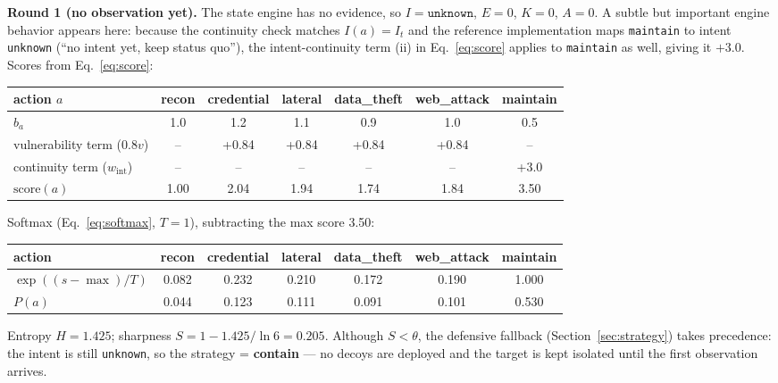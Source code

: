 \documentclass[preprints,article,accept,oneauthor]{Definitions/mdpi}
\newcommand{\act}[1]{\texttt{#1}}
\begin{document}
\textbf{Round 1 (no observation yet).} The state engine has no evidence, so
$I=\act{unknown}$, $E=0$, $K=0$, $A=0$. A subtle but important engine
behavior appears here: because the continuity check matches
$I(a) = I_t$ and the reference implementation maps \act{maintain} to
intent \act{unknown} (``no intent yet, keep status quo''), the
intent-continuity term (ii) in Eq.~\ref{eq:score} applies to
\act{maintain} as well, giving it $+3.0$. Scores from Eq.~\ref{eq:score}:
\begin{center}
\begin{adjustbox}{max width=\linewidth}\begin{tabular}{lcccccc}
\toprule
action $a$ & recon & credential & lateral & data\_theft & web\_attack & maintain \\
\midrule
$b_a$ & 1.0 & 1.2 & 1.1 & 0.9 & 1.0 & 0.5 \\
vulnerability term ($0.8v$) & -- & +0.84 & +0.84 & +0.84 & +0.84 & -- \\
continuity term ($w_{\mathrm{int}}$) & -- & -- & -- & -- & -- & +3.0 \\
$\mathrm{score}(a)$ & 1.00 & 2.04 & 1.94 & 1.74 & 1.84 & 3.50 \\
\bottomrule
\end{tabular}\end{adjustbox}
\end{center}
Softmax (Eq.~\ref{eq:softmax}, $T{=}1$), subtracting the max score 3.50:
\begin{center}
\begin{adjustbox}{max width=\linewidth}\begin{tabular}{lcccccc}
\toprule
action & recon & credential & lateral & data\_theft & web\_attack & maintain \\
\midrule
$\exp((s-\max)/T)$ & 0.082 & 0.232 & 0.210 & 0.172 & 0.190 & 1.000 \\
$P(a)$ & 0.044 & 0.123 & 0.111 & 0.091 & 0.101 & 0.530 \\
\bottomrule
\end{tabular}\end{adjustbox}
\end{center}
Entropy $H = 1.425$; sharpness $S = 1 - 1.425/\ln 6 = 0.205$. Although
$S < \theta$, the defensive fallback (Section~\ref{sec:strategy}) takes
precedence: the intent is still \act{unknown}, so the strategy =
\textbf{contain} --- no decoys are deployed and the target is kept
isolated until the first observation arrives.
\end{document}
